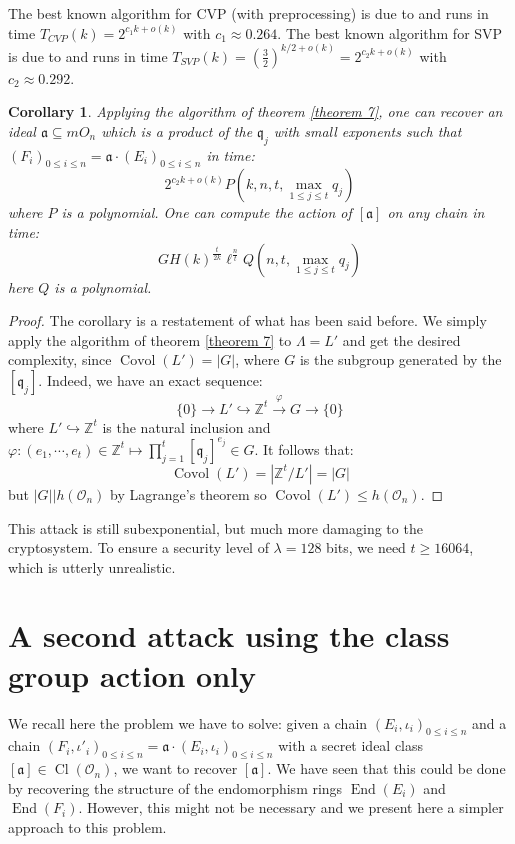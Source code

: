 \documentclass[a4paper,10pt]{report}
\theoremstyle{definition}
\theoremstyle{plain}
\newtheorem{corollary}[definition]{Corollary}
\theoremstyle{definition}
\newcommand{\Z}{\mathbb{Z}}
\newcommand{\mO}{\mathcal{O}}
\renewcommand{\(}{\left(}
\renewcommand{\)}{\right)}
\newcommand{\mf}[1]{\mathfrak{#1}}
\DeclareMathOperator{\End}{End}
\DeclareMathOperator{\Cl}{Cl}
\DeclareMathOperator{\Covol}{Covol}
\begin{document}
The best known algorithm for CVP (with preprocessing) is due to \cite{Ducas2020} and runs in time $T_{CVP}(k)=2^{c_1 k+o(k)}$ with $c_1\approx 0.264$. The best known algorithm for SVP is due to \cite{Ducas2016} and runs in time $T_{SVP}(k)=\(\frac{3}{2}\)^{k/2+o(k)}=2^{c_2 k+o(k)}$ with $c_2\approx 0.292$.

\begin{corollary}\label{corollary 1}
Applying the algorithm of theorem \ref{theorem 7}, one can recover an ideal $\mf{a}\subseteq mO_n$ which is a product of the $\mf{q}_j$ with small exponents such that $(F_i)_{0\leq i\leq n}=\mf{a}\cdot (E_i)_{0\leq i\leq n}$ in time: 
\[2^{c_2k+o(k)}P(k,n,t,\max_{1\leq j\leq t}q_j)\]
where $P$ is a polynomial.  One can compute the action of $[\mf{a}]$ on any chain in time: 
\[GH(k)^{\frac{t}{2k}}\ell^{\frac{n}{t}}Q(n,t,\max_{1\leq j\leq t}q_j)\] 
here $Q$ is a polynomial.
\end{corollary} 

\begin{proof}
The corollary is a restatement of what has been said before. We simply apply the algorithm of theorem \ref{theorem 7} to $\Lambda=L'$ and get the desired complexity, since $\Covol(L')=|G|$, where $G$ is the subgroup generated by the $[\mf{q}_j]$.  Indeed, we have an exact sequence:
\[\{0\}\longrightarrow L'\hookrightarrow \Z^t\overset{\varphi}{\longrightarrow} G\longrightarrow\{0\}\]
where $ L'\hookrightarrow \Z^t$ is the natural inclusion and $\varphi : (e_1,\cdots,e_t)\in\Z^t\longmapsto \prod_{j=1}^t[\mf{q}_j]^{e_j}\in G$. It follows that:
\[\Covol(L')=|\Z^t/L'|=|G|\]
but $|G||h(\mO_n)$ by Lagrange's theorem so $\Covol(L')\leq h(\mO_n)$.
\end{proof}

This attack is still subexponential, but much more damaging to the cryptosystem. To ensure a security level of $\lambda=128$ bits, we need $t\geq 16064$, which is utterly unrealistic.

\section{A second attack using the class group action only}

We recall here the problem we have to solve: given a chain $(E_i,\iota_i)_{0\leq i\leq n}$ and a chain $(F_i,\iota'_i)_{0\leq i\leq n}=\mf{a}\cdot(E_i,\iota_i)_{0\leq i\leq n}$ with a secret ideal class $[\mf{a}]\in\Cl(\mO_n)$, we want to recover $[\mf{a}]$. We have seen that this could be done by recovering the structure of the endomorphism rings $\End(E_i)$ and $\End(F_i)$. However, this might not be necessary and we present here a simpler approach to this problem. 
\end{document}
